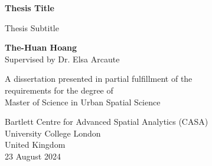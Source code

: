 \begin{titlepage}
    \begin{center}
        \vspace*{5cm}
 
        \textbf{Thesis Title}
 
        \vspace{0.5cm}
        Thesis Subtitle
             
        \vspace{1.5cm}
 
        \textbf{The-Huan Hoang}\\
        Supervised by Dr. Elsa Arcaute
 
        \vfill
             
        A dissertation presented in partial fulfillment of the\\ 
        requirements for the degree of\\
        Master of Science in Urban Spatial Science
             
        \vspace{0.8cm}
                 
        Bartlett Centre for Advanced Spatial Analytics (CASA) \\
        University College London\\
        United Kingdom\\
        23 August 2024
             
    \end{center}
 \end{titlepage}